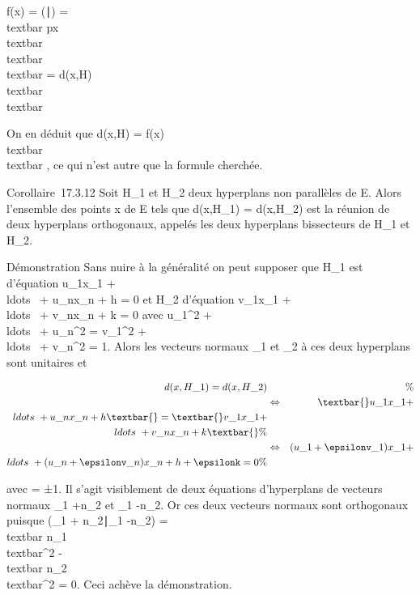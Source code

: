 \documentclass[]{article}
\begin{document}
\textbar{}f(x)\textbar{} =
\textbar{}(\overrightarrowpx∣\overrightarrown)\textbar{}
=\\textbar{}\overrightarrow
px\\textbar{}
\\textbar{}\overrightarrown\\textbar{}
=
d(x,H)\\textbar{}\overrightarrown\\textbar{}

On en déduit que d(x,H) = \textbar{}f(x)\textbar{}
\over
\\textbar{}\overrightarrown\\textbar{}
, ce qui n'est autre que la formule cherchée.

Corollaire~17.3.12 Soit H\_1 et H\_2 deux hyperplans non
parallèles de E. Alors l'ensemble des points x de E tels que
d(x,H\_1) = d(x,H\_2) est la réunion de deux hyperplans
orthogonaux, appelés les deux hyperplans bissecteurs de H\_1 et
H\_2.

Démonstration Sans nuire à la généralité on peut supposer que
H\_1 est d'équation u\_1x\_1 +
\\ldots~ +
u\_nx\_n + h = 0 et H\_2 d'équation
v\_1x\_1 +
\\ldots~ +
v\_nx\_n + k = 0 avec u\_1^2 +
\\ldots~ +
u\_n^2 = v\_1^2 +
\\ldots~ +
v\_n^2 = 1. Alors les vecteurs normaux
\overrightarrown\_1 et
\overrightarrown\_2 à ces deux hyperplans
sont unitaires et

\begin{align*} d(x,H\_1) =
d(x,H\_2)&& \%& \\ &
\Leftrightarrow & \textbar{}u\_1x\_1 +
\\ldots~ +
u\_nx\_n + h\textbar{} =
\textbar{}v\_1x\_1 +
\\ldots~ +
v\_nx\_n + k\textbar{}\%&
\\ & \Leftrightarrow &
(u\_1 + \epsilonv\_1)x\_1 +
\\ldots~ +
(u\_n + \epsilonv\_n)x\_n + h + \epsilonk = 0 \%&
\\ \end{align*}

avec \epsilon = ±1. Il s'agit visiblement de deux équations d'hyperplans de
vecteurs normaux \overrightarrown\_1
+\overrightarrow n\_2 et
\overrightarrown\_1
-\overrightarrow n\_2. Or ces deux vecteurs
normaux sont orthogonaux puisque
(\overrightarrown\_1
+\overrightarrow
n\_2∣\overrightarrown\_1
-\overrightarrow n\_2)
=\\textbar{}\overrightarrow
n\_1\\textbar{}^2
-\\textbar{}\overrightarrow
n\_2\\textbar{}^2 = 0. Ceci achève la
démonstration.
\end{document}
